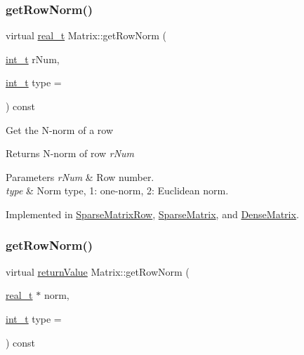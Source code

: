 \subsubsection{\texorpdfstring{get\+Row\+Norm()}{getRowNorm()}\hspace{0.1cm}{\footnotesize\ttfamily [1/2]}}
{\footnotesize\ttfamily virtual \hyperlink{qp_o_a_s_e_s__wrapper_8h_a0d00e2b3dfadee81331bbb39068570c4}{real\+\_\+t} Matrix\+::get\+Row\+Norm (\begin{DoxyParamCaption}\item[{\hyperlink{_types_8hpp_ab6fd6105e64ed14a0c9281326f05e623}{int\+\_\+t}}]{r\+Num,  }\item[{\hyperlink{_types_8hpp_ab6fd6105e64ed14a0c9281326f05e623}{int\+\_\+t}}]{type = {} }\end{DoxyParamCaption}) const\hspace{0.3cm}{\ttfamily [pure virtual]}}

Get the N-\/norm of a row \begin{DoxyReturn}{Returns}
N-\/norm of row {\itshape r\+Num} 
\end{DoxyReturn}

\begin{DoxyParams}{Parameters}
{\em r\+Num} & Row number. \\
\hline
{\em type} & Norm type, 1\+: one-\/norm, 2\+: Euclidean norm. \\
\hline
\end{DoxyParams}


Implemented in \hyperlink{class_sparse_matrix_row_a7124d79271aec2f02b47a119b26e86d9}{Sparse\+Matrix\+Row}, \hyperlink{class_sparse_matrix_acb880cf306a1e6c666c5374eaff8c9ce}{Sparse\+Matrix}, and \hyperlink{class_dense_matrix_a980d8bf632c1080fd6f67f8dfac853cc}{Dense\+Matrix}.

\mbox{\label{class_matrix_a7809892ec8eefd5963915b56564917ed}} 
\subsubsection{\texorpdfstring{get\+Row\+Norm()}{getRowNorm()}\hspace{0.1cm}{\footnotesize\ttfamily [2/2]}}
{\footnotesize\ttfamily virtual \hyperlink{_message_handling_8hpp_a81d556f613bfbabd0b1f9488c0fa865e}{return\+Value} Matrix\+::get\+Row\+Norm (\begin{DoxyParamCaption}\item[{\hyperlink{qp_o_a_s_e_s__wrapper_8h_a0d00e2b3dfadee81331bbb39068570c4}{real\+\_\+t} $\ast$}]{norm,  }\item[{\hyperlink{_types_8hpp_ab6fd6105e64ed14a0c9281326f05e623}{int\+\_\+t}}]{type = {} }\end{DoxyParamCaption}) const\hspace{0.3cm}{\ttfamily [pure virtual]}}


